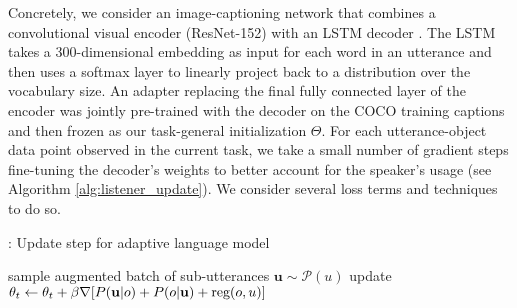 Concretely, we consider an image-captioning network that combines a convolutional visual encoder (ResNet-152) with an LSTM decoder \cite{vinyals_show_2015}.
The LSTM takes a 300-dimensional embedding as input for each word in an utterance and then uses a softmax layer to linearly project back to a distribution over the vocabulary size.
An adapter replacing the final fully connected layer of the encoder was jointly pre-trained with the decoder on the COCO training captions and then frozen as our task-general initialization $\Theta$.
For each utterance-object data point observed in the current task, we take a small number of gradient steps fine-tuning the decoder's weights to better account for the speaker's usage (see Algorithm \ref{alg:listener_update}).
We consider several loss terms and techniques to do so.

\begin{algorithm}[tb] %
	\caption{: Update step for adaptive language model}
    \label{alg:listener_update}
\begin{algorithmic}
        \STATE sample augmented batch of sub-utterances $\textbf{u} \sim \mathcal{P}(u)$
        \STATE update $\theta_t \leftarrow \theta_t + \beta\nabla[P(\bold{u} | o) + P(o | \bold{u})  + \text{reg}(o,u)]$
   \ENDFOR
\end{algorithmic}
\end{algorithm}

